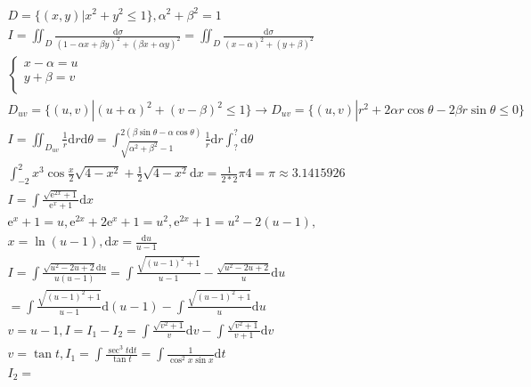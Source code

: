 \documentclass{article}
\begin{document}
\clearpage 
\begin{align*}
    D = \{(x,y)|x^2+y^2 \le 1\},\alpha^2+\beta^2 = 1 \\
    I = \iint_{D} \frac{\mathrm{d}\sigma}{(1-\alpha x+\beta y)^2+(\beta x+\alpha y)^2}  = \iint_{D} \frac{\mathrm{d}\sigma}{(x-\alpha)^2+(y+\beta)^2} \\
    \left\{
        \begin{array}{rl}
            x-\alpha = u \\
            y + \beta = v \\ 
        \end{array}
    \right. \\ 
    D_{uv} = \{(u,v)|(u+\alpha)^2+(v-\beta)^2 \le 1\} \rightarrow D_{uv} = \{(u,v)|r^2+2\alpha r\cos \theta -2\beta r \sin \theta \le 0\} \\
    I = \iint_{D_{uv}} \frac{1}{r} \mathrm{d}r \mathrm{d}\theta = \int_{\sqrt{\alpha^2+\beta^2}-1}^{2(\beta \sin \theta-\alpha \cos \theta)} \frac{1}{r}\mathrm{d}r \int_{?}^{?} \mathrm{d}\theta\\  
    \int_{-2}^{2} x^3\cos \frac{x}{2}\sqrt{4-x^2} + \frac{1}{2} \sqrt{4-x^2}\mathrm{d}x = \frac{1}{2*2}\pi 4 = \pi \approx 3.1415926 \\ 
    I = \int \frac{\sqrt{\mathrm{e}^{2x}+1}}{\mathrm{e}^{x}+1}\mathrm{d}x \\
    \mathrm{e}^{x}+1 = u ,\mathrm{e}^{2x}+2\mathrm{e}^{x}+1 = u^2 ,\mathrm{e}^{2x}+1 = u^2-2(u-1),\\
    x = \ln(u-1),\mathrm{d}x = \frac{\mathrm{d}u}{u-1} \\
    I = \int \frac{\sqrt{u^2-2u+2}\mathrm{d}u}{u(u-1)} = \int \frac{\sqrt{(u-1)^2+1}}{u-1}-\frac{\sqrt{u^2-2u+2}}{u} \mathrm{d}u\\
    = \int \frac{\sqrt{(u-1)^2+1}}{u-1} \mathrm{d}(u-1) -\int \frac{\sqrt{(u-1)^2+1}}{u} \mathrm{d}u \\
    v= u - 1 ,I =I_{1} - I_{2}= \int \frac{\sqrt{v^2+1}}{v}\mathrm{d}v-\int \frac{\sqrt{v^2+1}}{v+1}\mathrm{d}v \\ 
    v = \tan t,I_{1} = \int \frac{\sec^3 t\mathrm{d}t}{\tan t} = \int \frac{1}{\cos^2 x \sin x}\mathrm{d}t \\
    I_{2} = \\
\end{align*}
\end{document}
